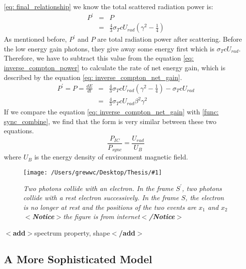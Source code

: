 \documentclass[12pt]{report}
\newcommand{\mycaption}[1]{\caption{\textit{\footnotesize #1}}}
\newcommand{\singleFig}[3]{
 \begin{figure}[!ht]
  \centering
  \texttt{[image: /Users/grewwc/Desktop/Thesis/\#1]}
  \mycaption{#3}
 \label{fig: #1}
 \end{figure} 
}
\newcommand{\add}[1]{
  $<$\textbf{add}$>$#1$<$\textbf{/add}$>$
}
\newcommand{\Notice}[1]{
  $<$\textbf{Notice}$>$#1$<$\textbf{/Notice}$>$
}
\begin{document}
          \ref{eq: final_relationship} we know the total scattered radiation power is:
          \begin{eqnarray}
            \label{eq: inverse_compton_power}
            P^{\prime} &=& P  \nonumber \\
                       &=& \frac{4}{3} \sigma_{T} c U_{rad} \left(\gamma^2 - \frac{1}{4}\right)
          \end{eqnarray}
          As mentioned before, $P^{\prime}$ and $P$ are total radiation power after scattering. Before the 
          low energy gain photons, they give away some energy first which is $\sigma_{T} c U_{rad}$. 
          Therefore, we have to subtract this value from the equation \ref{eq: inverse_compton_power} to 
          calculate the rate of net energy gain, which is described by the equation 
          \ref{eq: inverse_compton_net_gain}.
          \begin{eqnarray}
            \label{eq: inverse_compton_net_gain}
            P^{\prime} = P = \frac{dE}{dt} &=& \frac{4}{3} \sigma_{T} c U_{rad} \left(\gamma^2 - \frac{1}{4}\right) - \sigma_{T} c U_{rad} \nonumber \\
                                           &=& \frac{4}{3} \sigma_{T} c U_{rad} \beta^{2} \gamma^{2}
          \end{eqnarray}
          If we compare the equation \ref{eq: inverse_compton_net_gain} with \ref{func: sync_combine}, we 
          find that the form is very similar between these two equations. 
          \begin{equation}
            \label{eq: comparision_inverse_compton_and_sync}
            \frac{P_{IC}}{P_{sync}} = \frac{U_{rad}}{U_{B}}
          \end{equation}
          where $U_{B}$ is the energy density of environment magnetic field. 

          \vspace{1cm}
          \singleFig{inverse_compton_time_interval}{0.45}{Two photons collide with an electron. 
            In the frame $S^{\prime}$, two photons collide with a rest electron successively.
            In the frame $S$, the electron is no longer at rest and the positions of the two events 
            are $x_1$ and $x_2$ \Notice{the figure is from internet}}

          \add{spectrum property, shape}

        
          \subsection{A More Sophisticated Model}
\end{document}
